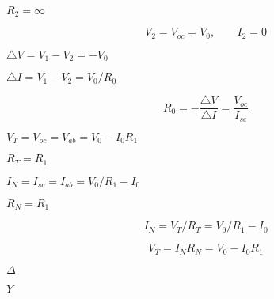 {\newpage\clearpage
{}%
$R_2=\infty$%
\lthtmlinlinemathZ
\lthtmlcheckvsize\clearpage}

{\newpage\clearpage
{}%
\begin{displaymath} V_2=V_{oc}=V_0,\;\;\;\;\;\;\;I_2=0 \end{displaymath}%
\lthtmldisplayZ
\lthtmlcheckvsize\clearpage}

{\newpage\clearpage
{}%
$\triangle V=V_1-V_2=-V_0$%
\lthtmlinlinemathZ
\lthtmlcheckvsize\clearpage}

{\newpage\clearpage
{}%
$\triangle I=V_1-V_2=V_0/R_0$%
\lthtmlinlinemathZ
\lthtmlcheckvsize\clearpage}

{\newpage\clearpage
{}%
\begin{displaymath} R_0=-\frac{\triangle V}{\triangle I}=\frac{V_{oc}}{I_{sc}} \end{displaymath}%
\lthtmldisplayZ
\lthtmlcheckvsize\clearpage}

{\newpage\clearpage
{}%
$V_T=V_{oc}=V_{ab}=V_0-I_0R_1$%
\lthtmlinlinemathZ
\lthtmlcheckvsize\clearpage}

{\newpage\clearpage
{}%
$R_T=R_1$%
\lthtmlinlinemathZ
\lthtmlcheckvsize\clearpage}

{\newpage\clearpage
{}%
$I_N=I_{sc}=I_{ab}=V_0/R_1-I_0$%
\lthtmlinlinemathZ
\lthtmlcheckvsize\clearpage}

{\newpage\clearpage
{}%
$R_N=R_1$%
\lthtmlinlinemathZ
\lthtmlcheckvsize\clearpage}

{\newpage\clearpage
{}%
\begin{displaymath} I_N=V_T/R_T=V_0/R_1-I_0	\end{displaymath}%
\lthtmldisplayZ
\lthtmlcheckvsize\clearpage}

{\newpage\clearpage
{}%
\begin{displaymath} V_T=I_N R_N=V_0-I_0R_1	\end{displaymath}%
\lthtmldisplayZ
\lthtmlcheckvsize\clearpage}

{\newpage\clearpage
{}%
$\Delta$%
\lthtmlinlinemathZ
\lthtmlcheckvsize\clearpage}

{\newpage\clearpage
{}%
$Y$%
\lthtmlinlinemathZ
\lthtmlcheckvsize\clearpage}

